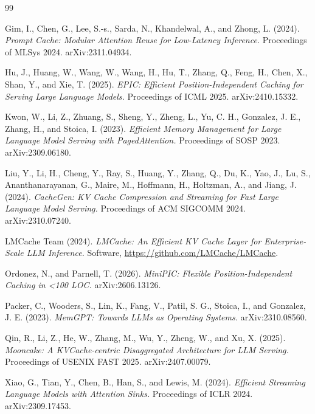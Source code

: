 \documentclass[11pt]{article}
\begin{document}
\begin{thebibliography}{99}\small

Gim, I., Chen, G., Lee, S.-s., Sarda, N., Khandelwal, A., and Zhong, L. (2024).
\emph{Prompt Cache: Modular Attention Reuse for Low-Latency Inference.}
Proceedings of MLSys 2024. arXiv:2311.04934.

Hu, J., Huang, W., Wang, W., Wang, H., Hu, T., Zhang, Q., Feng, H., Chen, X., Shan, Y., and Xie, T. (2025).
\emph{EPIC: Efficient Position-Independent Caching for Serving Large Language Models.}
Proceedings of ICML 2025. arXiv:2410.15332.

Kwon, W., Li, Z., Zhuang, S., Sheng, Y., Zheng, L., Yu, C. H., Gonzalez, J. E., Zhang, H., and Stoica, I. (2023).
\emph{Efficient Memory Management for Large Language Model Serving with PagedAttention.}
Proceedings of SOSP 2023. arXiv:2309.06180.

Liu, Y., Li, H., Cheng, Y., Ray, S., Huang, Y., Zhang, Q., Du, K., Yao, J., Lu, S., Ananthanarayanan, G., Maire, M., Hoffmann, H., Holtzman, A., and Jiang, J. (2024).
\emph{CacheGen: KV Cache Compression and Streaming for Fast Large Language Model Serving.}
Proceedings of ACM SIGCOMM 2024. arXiv:2310.07240.

LMCache Team (2024).
\emph{LMCache: An Efficient KV Cache Layer for Enterprise-Scale LLM Inference.}
Software, \url{https://github.com/LMCache/LMCache}.

Ordonez, N., and Parnell, T. (2026).
\emph{MiniPIC: Flexible Position-Independent Caching in {\textless}100 LOC.}
arXiv:2606.13126.

Packer, C., Wooders, S., Lin, K., Fang, V., Patil, S. G., Stoica, I., and Gonzalez, J. E. (2023).
\emph{MemGPT: Towards LLMs as Operating Systems.}
arXiv:2310.08560.

Qin, R., Li, Z., He, W., Zhang, M., Wu, Y., Zheng, W., and Xu, X. (2025).
\emph{Mooncake: A KVCache-centric Disaggregated Architecture for LLM Serving.}
Proceedings of USENIX FAST 2025. arXiv:2407.00079.

Xiao, G., Tian, Y., Chen, B., Han, S., and Lewis, M. (2024).
\emph{Efficient Streaming Language Models with Attention Sinks.}
Proceedings of ICLR 2024. arXiv:2309.17453.


\end{thebibliography}
\end{document}
